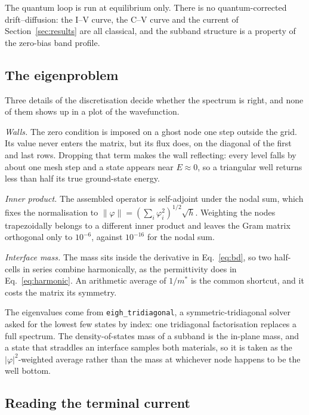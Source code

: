 \documentclass[preprint,12pt]{elsarticle}
\begin{document}
The quantum loop is run at equilibrium only. There is no quantum-corrected
drift--diffusion: the I--V curve, the C--V curve and the current of
Section~\ref{sec:results} are all classical, and the subband structure is a
property of the zero-bias band profile.

\subsection{The eigenproblem}

Three details of the discretisation decide whether the spectrum is right, and
none of them shows up in a plot of the wavefunction.

\emph{Walls.} The zero condition is imposed on a ghost node one step outside
the grid. Its value never enters the matrix, but its flux does, on the diagonal
of the first and last rows. Dropping that term makes the wall reflecting: every
level falls by about one mesh step and a state appears near $E\approx0$, so a
triangular well returns less than half its true ground-state energy.

\emph{Inner product.} The assembled operator is self-adjoint under the nodal
sum, which fixes the normalisation to
$\|\varphi\|=(\sum_i\varphi_i^2)^{1/2}\sqrt{h}$. Weighting the nodes
trapezoidally belongs to a different inner product and leaves the Gram matrix
orthogonal only to $10^{-6}$, against $10^{-16}$ for the nodal sum.

\emph{Interface mass.} The mass sits inside the derivative in
Eq.~\eqref{eq:bd}, so two half-cells in series combine harmonically, as the
permittivity does in Eq.~\eqref{eq:harmonic}. An arithmetic average of
$1/m^{*}$ is the common shortcut, and it costs the matrix its symmetry.

The eigenvalues come from \texttt{eigh\_tridiagonal}, a symmetric-tridiagonal
solver asked for the lowest few states by index: one tridiagonal
factorisation replaces a full spectrum. The density-of-states mass of a
subband is the in-plane mass, and a state that straddles an interface samples
both materials, so it is taken as the $|\varphi|^2$-weighted average rather
than the mass at whichever node happens to be the well bottom.

\subsection{Reading the terminal current}
\end{document}
